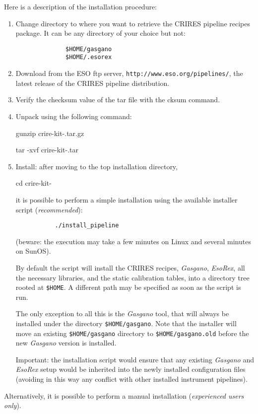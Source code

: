 Here is a description of the installation procedure:

\begin{enumerate}
\item Change directory to where you want to retrieve the CRIRES pipeline 
recipes package. It can be any directory of your choice but not: 
\begin{verbatim}
              $HOME/gasgano 
              $HOME/.esorex
\end{verbatim}

\item Download from the ESO ftp server, 
 \texttt{http://www.eso.org/pipelines/},
 the latest release of the CRIRES pipeline distribution.

\item Verify the checksum value of the tar file with the cksum command. 

\item Unpack using the following command:

    gunzip crire-kit-\pipelinevers.tar.gz       

    tar -xvf crire-kit-\pipelinevers.tar

\item Install: after moving to the top installation directory,

    cd crire-kit-\pipelinevers

it is possible to perform a simple installation using the available 
installer script ({\it recommended}):
\begin{verbatim}
           ./install_pipeline
\end{verbatim}

(beware: the execution may take a few minutes on Linux and several minutes 
on SunOS).

By default the script will install the CRIRES recipes,  {\it Gasgano}, 
 {\it EsoRex}, all the necessary libraries, and the static calibration 
tables, into a directory tree rooted at  {\tt \$HOME}. A different path 
may be specified as soon as the script is run.

The only exception to all this is the  {\it Gasgano}  tool, that will 
always be installed under the directory  {\tt \$HOME/gasgano}. Note that 
the installer will move an existing  {\tt \$HOME/gasgano}  directory to 
 {\tt \$HOME/gasgano.old}  before the new  {\it Gasgano}  version is 
installed.

Important: the installation script would ensure that any existing 
 {\it Gasgano}   and  {\it EsoRex}  setup would be inherited 
into the newly installed configuration files (avoiding in this way 
any conflict with other installed instrument pipelines).
\end{enumerate}

Alternatively, it is possible to perform a manual installation 
({\it experienced users only}).

